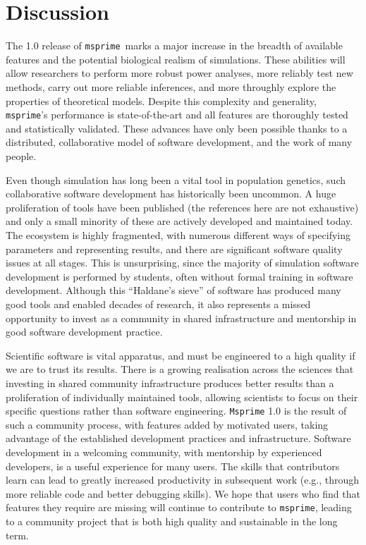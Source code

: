 \documentclass{article}
\newcommand{\msprime}[0]{\texttt{msprime}}
\begin{document}
\section*{Discussion}

The 1.0 release of \msprime\ marks a major increase in the
breadth of available features and the
potential biological realism of simulations.
These abilities will allow researchers to perform more robust power analyses,
more reliably test new methods,
carry out more reliable inferences,
and more throughly explore the properties of theoretical models.
Despite this complexity and generality,
\msprime's performance is state-of-the-art
and all features are thoroughly tested and statistically validated.
These advances have only been possible thanks to a distributed,
collaborative model of software development,
and the work of many people.


Even though simulation has long been a vital tool in population genetics,
such collaborative software development has historically been uncommon.
A huge proliferation of tools have been published
(the references here are not exhaustive)
and only a small minority of these are actively developed and
maintained today. The ecosystem is highly fragmented, with numerous different
ways of specifying parameters and representing results, and there are
significant software quality issues at all stages. This is unsurprising, since
the majority of simulation software development is performed by students,
often without formal training in software development.
Although this ``Haldane's sieve'' of software has produced many good tools
and enabled decades of research,
it also represents a missed opportunity to invest as a community
in shared infrastructure and mentorship in good software development practice.

Scientific software is vital apparatus, and must be engineered
to a high quality if we are to trust its results. There is a growing
realisation across the sciences
\citep[e.g.][]{siepel2019challenges,harris2020array,gardner2021sustained}
that investing in
shared community infrastructure produces better results than a
proliferation of individually maintained tools, allowing scientists
to focus on their specific questions rather than software engineering.
\texttt{Msprime} 1.0 is the result of such a community process,
with features added by motivated users, taking advantage of the
established development practices and infrastructure.
Software development in a welcoming community,
with mentorship by experienced developers,
is a useful experience for many users.
The skills that contributors learn
can lead to greatly increased productivity in subsequent
work (e.g., through more reliable code and better debugging skills).
We hope that users who find that
features they require are missing will continue to contribute to
\msprime, leading to a community project that is both high quality
and sustainable in the long term.
\end{document}
